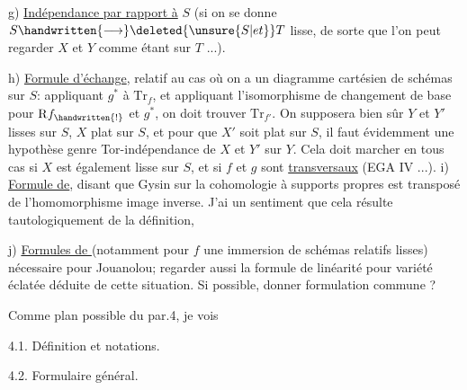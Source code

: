  g) \uline{Indépendance par rapport à} $S$ (si on se donne $S\handwritten{\longrightarrow}\deleted{\unsure{S|et}}T$ lisse, de sorte que l'on peut regarder $X$ et $Y$ comme étant sur $T$ ...).

 h) \uline{Formule d'échange}, relatif au cas où on a un diagramme cartésien
de schémas sur $S$: appliquant $g^*$ à $\mathrm{Tr}_f$, et appliquant  l'isomorphisme de changement de base pour $\mathrm{R}f_{\handwritten{!}}$ et $g^*$, on doit trouver $\mathrm{Tr}_{f'}$. On supposera bien sûr $Y$ et $Y'$ lisses sur $S$, $X$ plat sur $S$, et pour que $X'$ soit plat sur $S$, il faut évidemment une hypothèse genre Tor-indépendance de $X$ et $Y'$ sur $Y$. Cela doit marcher en tous cas si $X$ est également lisse sur $S$, et si $f$ et $g$ sont \uline{transversaux} (EGA IV ...).
 i) \uline{Formule de}, disant que Gysin  sur la cohomologie à supports propres est transposé de l'homomorphisme image inverse. J'ai un sentiment que cela résulte tautologiquement de la définition, 

 j) \uline{Formules de } (notamment pour $f$ une immersion de schémas relatifs lisses)\handwritten{,} nécessaire pour Jouanolou; regarder aussi la formule de linéarité pour variété éclatée déduite de cette situation. Si possible, donner formulation commune ?

Comme plan possible du par.4, je vois

4.1. Définition et notations.

4.2. Formulaire général.

